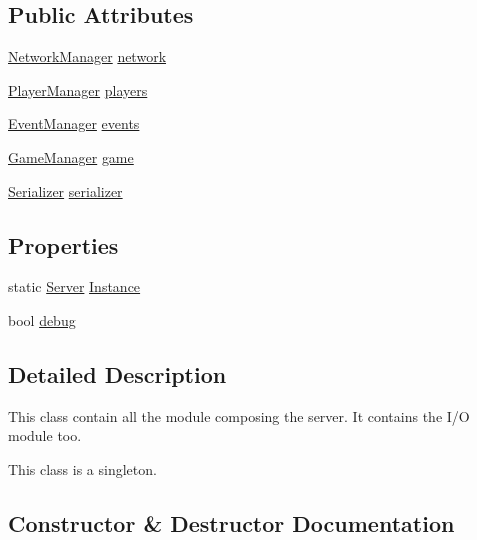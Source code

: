 \subsection*{Public Attributes}
\begin{DoxyCompactItemize}
\item 
\hyperlink{class_server_1_1_network_manager}{Network\+Manager} \hyperlink{class_server_1_1_server_a1bf9e09369666a2aac8968f74e45f6ad}{network}
\item 
\hyperlink{class_server_1_1_player_manager}{Player\+Manager} \hyperlink{class_server_1_1_server_a928d460f653e48aaa9c97ca77fc12a63}{players}
\item 
\hyperlink{class_server_1_1_event_manager}{Event\+Manager} \hyperlink{class_server_1_1_server_aa40e6489cb599b3a2e651794468adb55}{events}
\item 
\hyperlink{class_server_1_1_game_manager}{Game\+Manager} \hyperlink{class_server_1_1_server_a51d909a4a359caec248274776756af39}{game}
\item 
\hyperlink{class_common_1_1_serializer}{Serializer} \hyperlink{class_server_1_1_server_aca27435969e9497574ce1a886bd8aa82}{serializer}
\end{DoxyCompactItemize}
\subsection*{Properties}
\begin{DoxyCompactItemize}
\item 
static \hyperlink{class_server_1_1_server}{Server} \hyperlink{class_server_1_1_server_a6660837e8cc96449219c2c0f0c4afbf9}{Instance}
\item 
bool \hyperlink{class_server_1_1_server_a944c5350249b3be31a0d9b6762e49512}{debug}
\end{DoxyCompactItemize}


\subsection{Detailed Description}
This class contain all the module composing the server. It contains the I/O module too.

This class is a singleton. 

\subsection{Constructor \& Destructor Documentation}
\mbox{\label{class_server_1_1_server_a8e9b2b8663928808ab906762126879fa}} 
